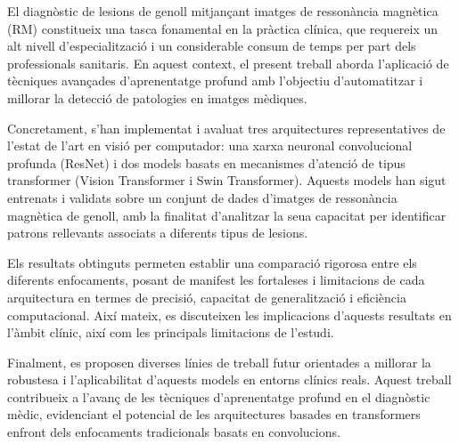 \documentclass[twoside,spanish,a4paper,12pt]{tfg}
\begin{document}
\begin{resumen}
El diagnòstic de lesions de genoll mitjançant imatges de ressonància magnètica (RM) constitueix una tasca fonamental en la pràctica clínica, que requereix un alt nivell d'especialització i un considerable consum de temps per part dels professionals sanitaris. En aquest context, el present treball aborda l'aplicació de tècniques avançades d'aprenentatge profund amb l'objectiu d'automatitzar i millorar la detecció de patologies en imatges mèdiques.

Concretament, s'han implementat i avaluat tres arquitectures representatives de l'estat de l'art en visió per computador: una xarxa neuronal convolucional profunda (ResNet) i dos models basats en mecanismes d'atenció de tipus transformer (Vision Transformer i Swin Transformer). Aquests models han sigut entrenats i validats sobre un conjunt de dades d'imatges de ressonància magnètica de genoll, amb la finalitat d'analitzar la seua capacitat per identificar patrons rellevants associats a diferents tipus de lesions.

Els resultats obtinguts permeten establir una comparació rigorosa entre els diferents enfocaments, posant de manifest les fortaleses i limitacions de cada arquitectura en termes de precisió, capacitat de generalització i eficiència computacional. Així mateix, es discuteixen les implicacions d'aquests resultats en l'àmbit clínic, així com les principals limitacions de l'estudi.

Finalment, es proposen diverses línies de treball futur orientades a millorar la robustesa i l'aplicabilitat d'aquests models en entorns clínics reals. Aquest treball contribueix a l'avanç de les tècniques d'aprenentatge profund en el diagnòstic mèdic, evidenciant el potencial de les arquitectures basades en transformers enfront dels enfocaments tradicionals basats en convolucions.
\end{resumen}
\cleardoublepage
\end{document}

